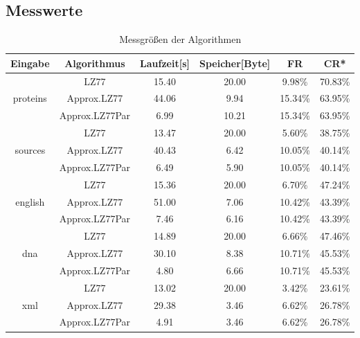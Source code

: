 \newpage
\subsection{Messwerte}

\begin{table}[ht]
    \centering
    \caption{Messgrößen der Algorithmen}
    \label{messwerte}
    \begin{tabular} { |c|c|c|c|c|c| }
        \hline
        \textbf{Eingabe} & \textbf{Algorithmus} & \textbf{Laufzeit[s]} & \textbf{Speicher[Byte]} & \textbf{FR} & \textbf{CR*} \\
        \hline
        & LZ77 & 15.40 & 20.00 & 9.98\% & 70.83\% \\
        proteins & Approx.LZ77 & 44.06 & 9.94 & 15.34\% & 63.95\% \\
        & Approx.LZ77Par & 6.99 & 10.21 & 15.34\% & 63.95\% \\
        \hline
        & LZ77 & 13.47 & 20.00 & 5.60\% & 38.75\% \\
        sources & Approx.LZ77 & 40.43 & 6.42 & 10.05\% & 40.14\% \\
        & Approx.LZ77Par & 6.49 & 5.90 & 10.05\% & 40.14\% \\
        \hline
        & LZ77 & 15.36 & 20.00 & 6.70\% & 47.24\% \\
        english & Approx.LZ77 & 51.00 & 7.06 & 10.42\% & 43.39\% \\
        & Approx.LZ77Par & 7.46 & 6.16 & 10.42\% & 43.39\% \\
        \hline
        & LZ77 & 14.89 & 20.00 & 6.66\% & 47.46\% \\
        dna & Approx.LZ77 & 30.10 & 8.38 & 10.71\% & 45.53\% \\
        & Approx.LZ77Par & 4.80 & 6.66 & 10.71\% & 45.53\% \\
        \hline
        & LZ77 & 13.02 & 20.00 & 3.42\% & 23.61\% \\
        xml & Approx.LZ77 & 29.38 & 3.46 & 6.62\% & 26.78\% \\
        & Approx.LZ77Par & 4.91 & 3.46 & 6.62\% & 26.78\% \\
        \hline
    \end{tabular}
\end{table}

